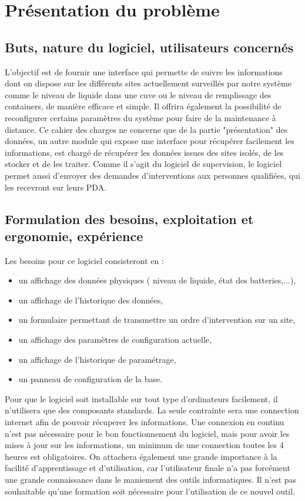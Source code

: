 \section{Présentation du problème}
\subsection{Buts, nature du logiciel, utilisateurs concernés}
L'objectif est de fournir une interface qui permette de suivre les informations dont on dispose sur les différents sites actuellement surveillés par notre système comme le niveau de liquide dans une cuve ou le niveau de remplissage des containers, de manière efficace et simple. Il offrira également la possibilité de reconfigurer certains paramètres du système pour faire de la maintenance à distance.
Ce cahier des charges ne concerne que de la partie "présentation" des données, un autre module  qui expose une interface pour récupérer facilement les informations, est chargé de récupérer les données issues des sites isolés, de les stocker et de les traiter.
Comme il s'agit du logiciel de supervision, le logiciel permet aussi d'envoyer des demandes d'interventions aux personnes qualifiées, qui les recevront sur leurs PDA.

\subsection{Formulation des besoins, exploitation et ergonomie, expérience}
Les besoins pour ce logiciel consisteront en :
\begin{itemize}
	\item un affichage des données physiques ( niveau de liquide, état des batteries,...),
	\item un affichage de l'historique des données,
	\item un formulaire permettant de transmettre un ordre d'intervention sur un site,
	\item un affichage des paramètres de configuration actuelle,
	\item un affichage de l'historique de paramétrage,
	\item un panneau de configuration de la base.
\end{itemize}

Pour que le logiciel soit installable sur tout type d'ordinateurs facilement, il n'utilisera que des composants standards. La seule contrainte sera une connection internet afin de pouvoir récuperer les informations. Une connexion en continu n'est pas nécessaire pour le bon fonctionnement du logiciel, mais pour avoir les mises à jour sur les informations, un minimum de une connection toutes les 4 heures est obligatoires.
On attachera également une grande importance à la facilité d'apprentissage et d'utilisation, car l'utilisateur finale n'a pas forcément une grande connaissance dans le maniement des outils informatiques. Il n'est pas souhaitable qu'une formation soit nécessaire pour l'utilisation de ce nouvel outil.

